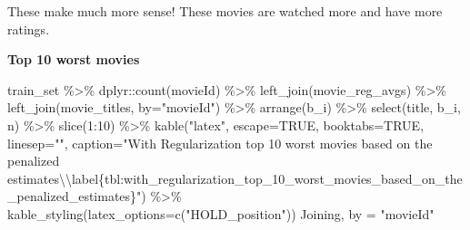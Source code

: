 \documentclass[
]{article}
\newenvironment{Shaded}{}{}
\newcommand{\AttributeTok}[1]{\textcolor[rgb]{0.49,0.56,0.16}{#1}}
\newcommand{\ConstantTok}[1]{\textcolor[rgb]{0.53,0.00,0.00}{#1}}
\newcommand{\DecValTok}[1]{\textcolor[rgb]{0.25,0.63,0.44}{#1}}
\newcommand{\FunctionTok}[1]{\textcolor[rgb]{0.02,0.16,0.49}{#1}}
\newcommand{\NormalTok}[1]{#1}
\newcommand{\OtherTok}[1]{\textcolor[rgb]{0.00,0.44,0.13}{#1}}
\newcommand{\SpecialCharTok}[1]{\textcolor[rgb]{0.25,0.44,0.63}{#1}}
\newcommand{\StringTok}[1]{\textcolor[rgb]{0.25,0.44,0.63}{#1}}
\begin{document}
These make much more sense! These movies are watched more and have more
ratings.

\newpage

\textbf{Top 10 worst movies}

\begin{Shaded}
\begin{Highlighting}[]
\NormalTok{train\_set }\SpecialCharTok{\%\textgreater{}\%}
\NormalTok{  dplyr}\SpecialCharTok{::}\FunctionTok{count}\NormalTok{(movieId) }\SpecialCharTok{\%\textgreater{}\%} 
  \FunctionTok{left\_join}\NormalTok{(movie\_reg\_avgs) }\SpecialCharTok{\%\textgreater{}\%}
  \FunctionTok{left\_join}\NormalTok{(movie\_titles, }\AttributeTok{by=}\StringTok{"movieId"}\NormalTok{) }\SpecialCharTok{\%\textgreater{}\%}
  \FunctionTok{arrange}\NormalTok{(b\_i) }\SpecialCharTok{\%\textgreater{}\%} 
  \FunctionTok{select}\NormalTok{(title, b\_i, n) }\SpecialCharTok{\%\textgreater{}\%} 
  \FunctionTok{slice}\NormalTok{(}\DecValTok{1}\SpecialCharTok{:}\DecValTok{10}\NormalTok{) }\SpecialCharTok{\%\textgreater{}\%} 
  \FunctionTok{kable}\NormalTok{(}\StringTok{"latex"}\NormalTok{, }\AttributeTok{escape=}\ConstantTok{TRUE}\NormalTok{, }\AttributeTok{booktabs=}\ConstantTok{TRUE}\NormalTok{, }\AttributeTok{linesep=}\StringTok{""}\NormalTok{, }\AttributeTok{caption=}\StringTok{"With Regularization top 10 worst movies based on the penalized estimates}\SpecialCharTok{\textbackslash{}\textbackslash{}}\StringTok{label\{tbl:with\_regularization\_top\_10\_worst\_movies\_based\_on\_the\_penalized\_estimates\}"}\NormalTok{) }\SpecialCharTok{\%\textgreater{}\%}
    \FunctionTok{kable\_styling}\NormalTok{(}\AttributeTok{latex\_options=}\FunctionTok{c}\NormalTok{(}\StringTok{"HOLD\_position"}\NormalTok{))}
\NormalTok{Joining, by }\OtherTok{=} \StringTok{"movieId"}
\end{Highlighting}
\end{Shaded}
\end{document}
